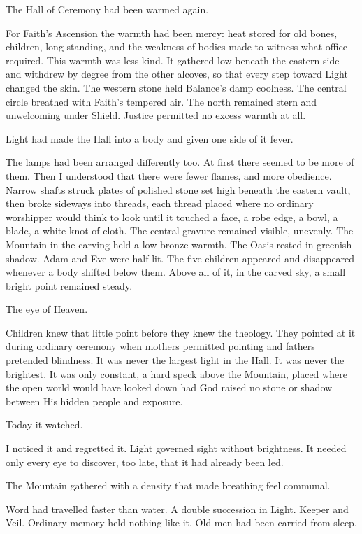 The Hall of Ceremony had been warmed again.\par
For Faith's Ascension the warmth had been mercy: heat stored for old bones, children, long standing, and the weakness of bodies made to witness what office required.
This warmth was less kind.
It gathered low beneath the eastern side and withdrew by degree from the other alcoves, so that every step toward Light changed the skin.
The western stone held Balance's damp coolness.
The central circle breathed with Faith's tempered air.
The north remained stern and unwelcoming under Shield.
Justice permitted no excess warmth at all.\par
Light had made the Hall into a body and given one side of it fever.\par
The lamps had been arranged differently too.
At first there seemed to be more of them.
Then I understood that there were fewer flames, and more obedience.
Narrow shafts struck plates of polished stone set high beneath the eastern vault, then broke sideways into threads, each thread placed where no ordinary worshipper would think to look until it touched a face, a robe edge, a bowl, a blade, a white knot of cloth.
The central gravure remained visible, unevenly.
The Mountain in the carving held a low bronze warmth.
The Oasis rested in greenish shadow.
Adam and Eve were half-lit.
The five children appeared and disappeared whenever a body shifted below them.
Above all of it, in the carved sky, a small bright point remained steady.\par
The eye of Heaven.\par
Children knew that little point before they knew the theology.
They pointed at it during ordinary ceremony when mothers permitted pointing and fathers pretended blindness.
It was never the largest light in the Hall.
It was never the brightest.
It was only constant, a hard speck above the Mountain, placed where the open world would have looked down had God raised no stone or shadow between His hidden people and exposure.\par
Today it watched.\par
I noticed it and regretted it.
Light governed sight without brightness.
It needed only every eye to discover, too late, that it had already been led.\par
The Mountain gathered with a density that made breathing feel communal.\par
Word had travelled faster than water.
A double succession in Light.
Keeper and Veil.
Ordinary memory held nothing like it.
Old men had been carried from sleep.
